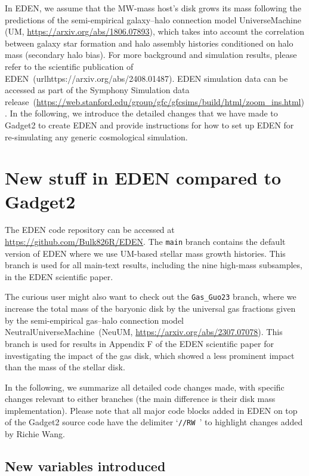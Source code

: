 \documentclass[12pt]{article}
\begin{document}
    In EDEN, we assume that the MW-mass host's disk grows its mass following the predictions of the semi-empirical galaxy--halo connection model UniverseMachine (UM, \url{https://arxiv.org/abs/1806.07893}), which takes into account the correlation between galaxy star formation and halo assembly histories conditioned on halo mass (secondary halo bias). For more background and simulation results, please refer to the scientific publication of EDEN~(url{https://arxiv.org/abs/2408.01487}). EDEN simulation data can be accessed as part of the Symphony Simulation data release~(\url{https://web.stanford.edu/group/gfc/gfcsims/build/html/zoom_ins.html}). In the following, we introduce the detailed changes that we have made to Gadget2 to create EDEN and provide instructions for how to set up EDEN for re-simulating any generic cosmological simulation.
		
	\section{New stuff in EDEN compared to Gadget2}
    
    The EDEN code repository can be accessed at \url{https://github.com/Bulk826R/EDEN}. The \texttt{main} branch contains the default version of EDEN where we use UM-based stellar mass growth histories. This branch is used for all main-text results, including the nine high-mass subsamples, in the EDEN scientific paper. 
    
    The curious user might also want to check out the \texttt{Gas\_Guo23} branch, where we increase the total mass of the baryonic disk by the universal gas fractions given by the semi-empirical gas--halo connection model NeutralUniverseMachine~(NeuUM, \url{https://arxiv.org/abs/2307.07078}). This branch is used for results in Appendix F of the EDEN scientific paper for investigating the impact of the gas disk, which showed a less prominent impact than the mass of the stellar disk.

    In the following, we summarize all detailed code changes made, with specific changes relevant to either branches (the main difference is their disk mass implementation). Please note that all major code blocks added in EDEN on top of the Gadget2 source code have the delimiter `\texttt{//RW }' to highlight changes added by Richie Wang.
    
    \subsection{New variables introduced}
\end{document}
